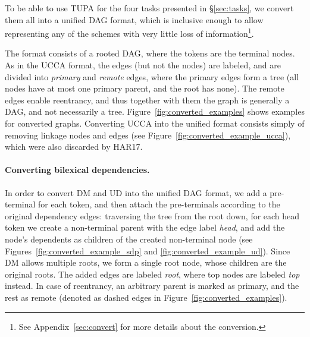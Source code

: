 \documentclass[11pt,a4paper]{article}
\begin{document}
To be able to use TUPA for the four tasks presented in \S\ref{sec:tasks},
we convert them all into a unified DAG format, which is inclusive enough to
allow representing any of the schemes with very little loss of information\footnote{See
Appendix~\ref{sec:convert} for more details about the conversion.}.

The format consists of a rooted DAG, where the tokens are the terminal nodes.
As in the UCCA format, the edges (but not the nodes) are labeled,
and are divided into \textit{primary} and \textit{remote} edges,
where the primary edges form a tree (all nodes have at most one primary parent,
and the root has none).
The remote edges enable reentrancy, and thus together with them the graph
is generally a DAG, and not necessarily a tree.
Figure~\ref{fig:converted_examples} shows examples for converted graphs.
Converting UCCA into the unified format consists simply of removing linkage 
nodes and edges (see Figure~\ref{fig:converted_example_ucca}), which were
also discarded by HAR17.

\paragraph{Converting bilexical dependencies.}
In order to convert DM and UD into the unified DAG format,
we add a pre-terminal for each token,
and then attach the pre-terminals according to the original dependency edges:
traversing the tree from the root down, for each head token we create a non-terminal
parent with the edge label {\it head},
and add the node's dependents as children of the created non-terminal node
(see Figures~\ref{fig:converted_example_sdp} and \ref{fig:converted_example_ud}).
Since DM allows multiple roots, we form a single root node, whose children
are the original roots. The added edges are labeled \textit{root}, where
top nodes are labeled \textit{top} instead.
In case of reentrancy, an arbitrary parent is marked as primary, and the rest as remote
(denoted as dashed edges in Figure~\ref{fig:converted_examples}).
\end{document}
